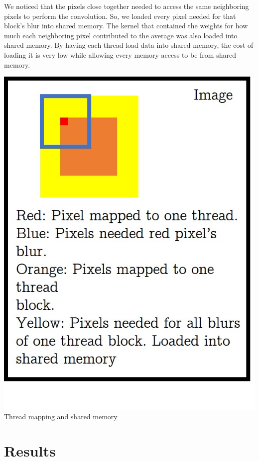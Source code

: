 \documentclass[12pt]{article}
\begin{document}
We noticed that the pixels close together needed to access the same neighboring
pixels to perform the convolution. So, we loaded every pixel needed for that
block's blur into shared memory. The kernel that contained the weights for how
much each neighboring pixel contributed to the average was also loaded into
shared memory. By having each thread load data into shared
memory, the cost of loading it is very low while allowing every memory
access to be from shared memory.

\begin{center}
\includegraphics[scale=0.3]{mapping.jpg} \\
Thread mapping and shared memory
\end{center}

\section{Results}
\end{document}
